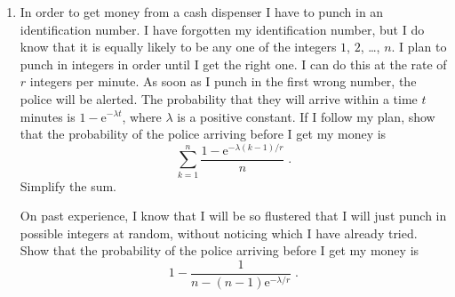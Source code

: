 \documentclass[a4, 11pt]{report}
\newlength{\qspace}
\newcounter{qnumber}
\newenvironment{question}%
 {\vspace{\qspace}
  \begin{enumerate}[\bfseries 1\quad][10]%
    \setcounter{enumi}{\value{qnumber}}%
    \item%
 }
{
  \end{enumerate}
  \filbreak
  \stepcounter{qnumber}
 }
\def\e{{\mathrm e}}
\begin{document}
\begin{question}
In order to get money from a cash dispenser 
I have to punch in an
identification  number.  I have forgotten my  identification number, 
but I do know that it is equally likely to be any one of the 
integers $1$, $2$, \ldots , $n$.
I plan to punch in integers  in order until I get the right 
one. I can do this at the rate of $r$ integers  per minute. 
As soon as I punch in the first  wrong number, the police will be alerted. 
The probability that  they will arrive within  a time $t$ minutes 
is $1-\e^{-\lambda t}$, where $\lambda$ is a  positive constant.
If I follow my plan, show that the probability of the police arriving
before I get my money is
\[
\sum_{k=1}^n \frac{1-\e^{-\lambda(k-1)/r}}n\;.
\]
Simplify the sum.

On past experience, I know that I will  be so flustered that I will 
just punch in possible integers at random, without noticing which  I have 
already tried. Show that the probability of the police arriving before
I get my money is
\[
1-\frac1{n-(n-1)\e^{-\lambda/r}} \;.
\]
\end{question}
	
\end{document}
